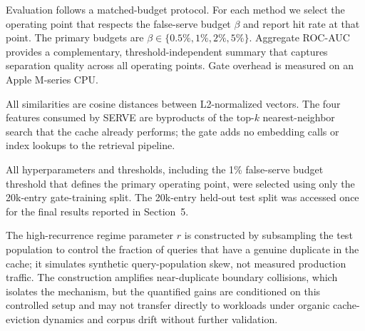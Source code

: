 Evaluation follows a matched-budget protocol. For each method we select the operating point that respects the false-serve budget $\beta$ and report hit rate at that point. The primary budgets are $\beta \in \{0.5\%, 1\%, 2\%, 5\%\}$.
Aggregate ROC-AUC provides a complementary, threshold-independent summary that captures separation quality across all operating points. Gate overhead is measured on an Apple M-series CPU.

All similarities are cosine distances between L2-normalized vectors. The four features consumed by SERVE are byproducts of the top-$k$ nearest-neighbor search that the cache already performs; the gate adds no embedding calls or index lookups to the retrieval pipeline.

All hyperparameters and thresholds, including the 1\% false-serve budget threshold that defines the primary operating point, were selected using only the 20k-entry gate-training split.
The 20k-entry held-out test split was accessed once for the final results reported in Section~5.

The high-recurrence regime parameter $r$ is constructed by subsampling the test population to control the fraction of queries that have a genuine duplicate in the cache; it simulates synthetic query-population skew, not measured production traffic.
The construction amplifies near-duplicate boundary collisions, which isolates the mechanism, but the quantified gains are conditioned on this controlled setup and may not transfer directly to workloads under organic cache-eviction dynamics and corpus drift without further validation.
